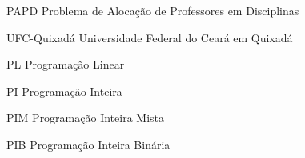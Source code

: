 
\begin{siglas}
	\item[PAPD] Problema de Alocação de Professores em Disciplinas
	\item[UFC-Quixadá] Universidade Federal do Ceará em Quixadá
	\item[PL] Programação Linear 
	\item[PI] Programação Inteira
    \item[PIM] Programação Inteira Mista 
    \item[PIB] Programação Inteira Binária
\end{siglas}
